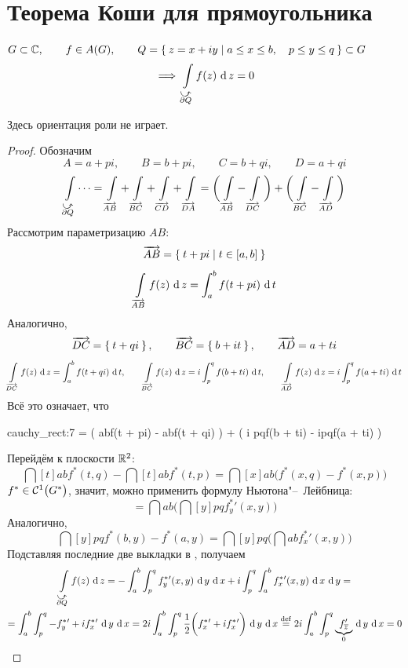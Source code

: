 \section{Теорема Коши для прямоугольника}

\begin{theorem}
	$ G \sub \Co, \qquad f \in A(G), \qquad Q = \set{z = x + iy \mid a \le x \le b, \quad p \le y \le q} \sub G $
	$$ \implies \cint[z]{\curvedir{\partial Q}}{f(z)} = 0 $$
\end{theorem}

\begin{note}
	Здесь ориентация роли не играет.
\end{note}

\begin{proof}
	Обозначим
	$$ A = a + pi, \qquad B = b + pi, \qquad C = b + qi, \qquad D = a + qi $$
	$$ \int\limits_{\curvedir{\partial Q}}\dots = \int\limits_{\overrightarrow{AB}} + \int\limits_{\overrightarrow{BC}} + \int\limits_{\overrightarrow{CD}} + \int\limits_{\overrightarrow{DA}} = \bigg( \int\limits_{\overrightarrow{AB}} - \int\limits_{\overrightarrow{DC}} \bigg) + \bigg( \int\limits_{\overrightarrow{BC}} - \int\limits_{\overrightarrow{AD}} \bigg) $$
	Рассмотрим параметризацию $ AB $:
	$$ \overrightarrow{AB} = \set{t + pi \mid t \in [a, b]} $$
	$$ \cint[z]{\overrightarrow{AB}}{f(z)} = \dint[t]ab{f(t + pi)} $$
	Аналогично,
	$$ \overrightarrow{DC} = \set{t + qi}, \qquad \overrightarrow{BC} = \set{b + it}, \qquad \overrightarrow{AD} = {a + ti} $$
	$$ \cint[z]{\overrightarrow{DC}}{f(z)} = \dint[t]ab{f(t + qi)}, \qquad \cint[z]{\overrightarrow{BC}}{f(z)} = i\dint[t]pq{f(b + ti)}, \qquad \cint[z]{\overrightarrow{AD}}{f(z)} = i\dint[t]pq{f(a + ti)} $$
	Всё это означает, что
	\begin{equ}{cauchy_rect:7}
		 = \bigg( \dint[t]ab{f(t + pi)} - \dint[t]ab{f(t + qi)} \bigg) + \bigg( i \dint[t]pq{f(b + ti)} - i\dint[t]pq{f(a + ti)} \bigg)
	\end{equ}
	Перейдём к плоскости $ \R^2 $:
	$$ \dint[t]ab{f^*(t, q)} - \dint[t]ab{f^*(t, p)} = \dint[x]ab{ \bigg( f^*(x, q) - f^*(x, p) \bigg) } $$
	$ f^* \in \Cont[1]{G^*} $, значит, можно применить формулу Ньютона"--~Лейбница:
	$$ = \dint ab{ \bigg( \dint[y]pq{f_y^*{}'(x, y)} \bigg)} $$
	Аналогично,
	$$ \dint[y]pq{f^*(b, y) - f^*(a, y)} = \dint[y]pq{ \bigg( \dint ab{f_x^*{}'(x, y)} \bigg) } $$
	Подставляя последние две выкладки в , получаем
	\begin{multline*}
		\cint[z]{\curvedir{\partial Q}}{f(z)} = -\dint ab{ \dint[y]pq{ f_y^*{}'(x, y)}} + i \dint[y]pq{ \dint ab{f_x^*{}'(x, y)}} = \\
		= \dint ab{ \dint[y]pq{ -f_y^*{}' + if_x^*{}'}} = 2i \dint ab{ \dint[y]pq {\frac12 \bigg( f_x^*{}' + if_x^*{}' \bigg)}} \bydef 2i \dint ab { \dint[y]pq{ \underbrace{f_{\ol z}'}_0}} = 0
	\end{multline*}
\end{proof}

